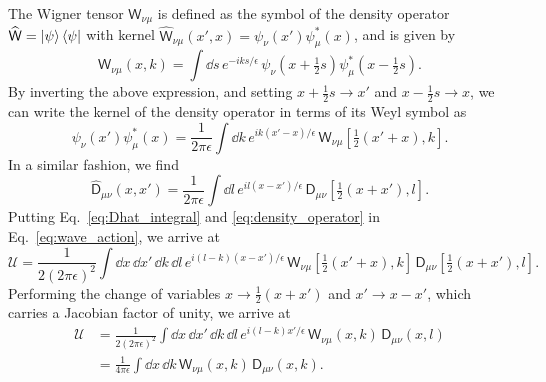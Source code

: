 The Wigner tensor $\mathsf{W}_{\nu\mu}$ is defined as the symbol of the density operator $\widehat{\mathsf{W}} = \mathinner{\lvert{\psi}\rangle}\mathinner{\langle{\psi}\rvert}$ with kernel $\widehat{\mathsf{W}}_{\nu\mu}(x',x) = \psi_{\nu}(x')\psi_{\mu}^{*}(x)$, and is given by
%
\begin{equation}
  \mathsf{W}_{\nu\mu}(x, k) = \int \dd{s}\, e^{-iks/\epsilon}\, \psi_{\nu}\left(x + \tfrac{1}{2}s\right)\psi^{*}_{\mu}\left(x - \tfrac{1}{2}s\right).
\end{equation}
%
By inverting the above expression, and setting $x + \frac{1}{2}s \to x'$ and $x- \frac{1}{2}s \to x$, we can write the kernel of the density operator in terms of its Weyl symbol as
%
%
\begin{equation}
  \psi_{\nu}(x') \psi^{*}_{\mu}(x) = \frac{1}{2\pi \epsilon} \int \dd{k}\, e^{ik(x' -x)/\epsilon}\,\mathsf{W}_{\nu\mu}\left[\tfrac{1}{2}(x' + x), k\right].
  \label{eq:density_operator}
\end{equation}
%
In a similar fashion, we find
%
\begin{equation}
  \widehat{\mathsf{D}}_{\mu\nu}(x, x') = \frac{1}{2\pi\epsilon} \int \dd{l}\, e^{il(x -x')/\epsilon}\,\mathsf{D}_{\mu\nu}\left[\tfrac{1}{2}(x + x'), l\right].
  \label{eq:Dhat_integral}
\end{equation}
%
Putting Eq.~\eqref{eq:Dhat_integral} and \eqref{eq:density_operator} in Eq.~\eqref{eq:wave_action}, we arrive at
%
\begin{equation}
  \mathscr{U} = \frac{1}{2(2\pi\epsilon)^{2}}\int \dd{x}\,\dd{x'}\,\dd{k}\,\dd{l}\, e^{i(l-k)(x -x')/\epsilon}\,\mathsf{W}_{\nu\mu}\left[\tfrac{1}{2}(x' + x), k\right]\, \mathsf{D}_{\mu\nu}\left[\tfrac{1}{2}(x + x'), l\right].
\end{equation}
%
Performing the change of variables $x \to \frac{1}{2}(x + x')$ and $x' \to x - x'$, which carries a Jacobian factor of unity, we arrive at
%
\begin{equation}
  \begin{aligned}
    \mathscr{U} &= \frac{1}{2(2\pi\epsilon)^{2}}\int \dd{x}\,\dd{x'}\,\dd{k}\,\dd{l}\, e^{i(l-k)x'/\epsilon}\,\mathsf{W}_{\nu\mu}(x, k)\, \mathsf{D}_{\mu\nu}(x, l)\\
                &= \frac{1}{4\pi\epsilon}\int \dd{x}\,\dd{k}\,\mathsf{W}_{\nu\mu}(x,k)\,\mathsf{D}_{\mu\nu}(x, k).
  \end{aligned}
  \label{eq:wave_action_symbol_form}
\end{equation}

